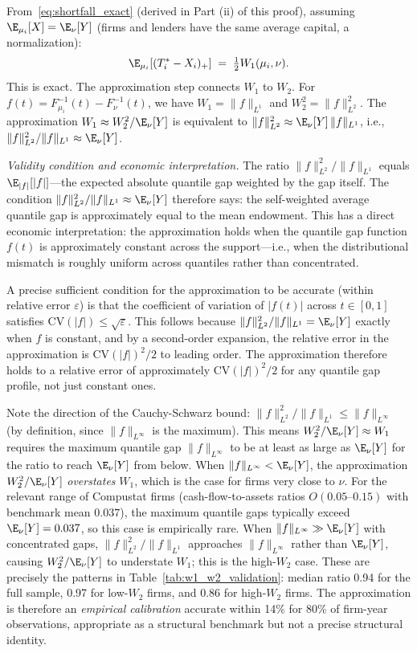 From~\eqref{eq:shortfall_exact} (derived in Part (ii) of this proof), assuming $\E_{\mu_i}[X] = \E_\nu[Y]$ (firms and lenders have the same average capital, a normalization):
\[
  \E_{\mu_i}[(T_i^*-X_i)_+] \;=\; \tfrac{1}{2}W_1(\mu_i,\nu).
\]
This is exact. The approximation step connects $W_1$ to $W_2$. For $f(t) = F_{\mu_i}^{-1}(t)-F_\nu^{-1}(t)$, we have $W_1 = \|f\|_{L^1}$ and $W_2^2 = \|f\|_{L^2}^2$. The approximation $W_1 \approx W_2^2/\E_\nu[Y]$ is equivalent to $\|f\|_{L^2}^2 \approx \E_\nu[Y]\,\|f\|_{L^1}$, i.e., $\|f\|_{L^2}^2/\|f\|_{L^1} \approx \E_\nu[Y]$.

\emph{Validity condition and economic interpretation.} The ratio $\|f\|_{L^2}^2/\|f\|_{L^1}$ equals $\E_{|f|}[|f|]$---the expected absolute quantile gap weighted by the gap itself. The condition $\|f\|_{L^2}^2/\|f\|_{L^1} \approx \E_\nu[Y]$ therefore says: the self-weighted average quantile gap is approximately equal to the mean endowment. This has a direct economic interpretation: the approximation holds when the quantile gap function $f(t)$ is approximately constant across the support---i.e., when the distributional mismatch is roughly uniform across quantiles rather than concentrated.

A precise sufficient condition for the approximation to be accurate (within relative error $\varepsilon$) is that the coefficient of variation of $|f(t)|$ across $t \in [0,1]$ satisfies $\mathrm{CV}(|f|) \leq \sqrt{\varepsilon}$. This follows because $\|f\|_{L^2}^2/\|f\|_{L^1} = \E_\nu[Y]$ exactly when $f$ is constant, and by a second-order expansion, the relative error in the approximation is $\mathrm{CV}(|f|)^2/2$ to leading order. The approximation therefore holds to a relative error of approximately $\mathrm{CV}(|f|)^2/2$ for any quantile gap profile, not just constant ones.

Note the direction of the Cauchy-Schwarz bound: $\|f\|_{L^2}^2/\|f\|_{L^1} \leq \|f\|_{L^\infty}$ (by definition, since $\|f\|_{L^\infty}$ is the maximum). This means $W_2^2/\E_\nu[Y] \approx W_1$ requires the maximum quantile gap $\|f\|_{L^\infty}$ to be at least as large as $\E_\nu[Y]$ for the ratio to reach $\E_\nu[Y]$ from below. When $\|f\|_{L^\infty} < \E_\nu[Y]$, the approximation $W_2^2/\E_\nu[Y]$ \emph{overstates} $W_1$, which is the case for firms very close to $\nu$. For the relevant range of Compustat firms (cash-flow-to-assets ratios $O(0.05\text{--}0.15)$ with benchmark mean $0.037$), the maximum quantile gaps typically exceed $\E_\nu[Y] = 0.037$, so this case is empirically rare. When $\|f\|_{L^\infty} \gg \E_\nu[Y]$ with concentrated gaps, $\|f\|_{L^2}^2/\|f\|_{L^1}$ approaches $\|f\|_{L^\infty}$ rather than $\E_\nu[Y]$, causing $W_2^2/\E_\nu[Y]$ to understate $W_1$; this is the high-$W_2$ case. These are precisely the patterns in Table~\ref{tab:w1_w2_validation}: median ratio 0.94 for the full sample, 0.97 for low-$W_2$ firms, and 0.86 for high-$W_2$ firms. The approximation is therefore an \emph{empirical calibration} accurate within 14\% for 80\% of firm-year observations, appropriate as a structural benchmark but not a precise structural identity.

